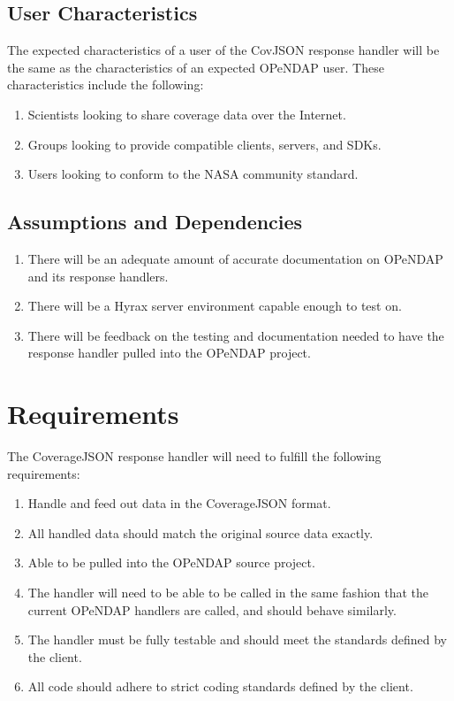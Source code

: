 \documentclass[onecolumn, draftclsnofoot,10pt, compsoc]{IEEEtran}
\begin{document}
\subsection{User Characteristics}
The expected characteristics of a user of the CovJSON response handler will be the same as the characteristics of an expected OPeNDAP user. These characteristics include the following:
\begin{enumerate}
\item Scientists looking to share coverage data over the Internet.
\item Groups looking to provide compatible clients, servers, and SDKs.
\item Users looking to conform to the NASA community standard.

\end{enumerate}

\subsection{Assumptions and Dependencies}
\begin{enumerate}
\item There will be an adequate amount of accurate documentation on OPeNDAP and its response handlers.
\item There will be a Hyrax server environment capable enough to test on.
\item There will be feedback on the testing and documentation needed to have the response handler pulled into the OPeNDAP project.
\end{enumerate}

\section{Requirements}
The CoverageJSON response handler will need to fulfill the following requirements:
\begin{enumerate}
\item Handle and feed out data in the CoverageJSON format.
\item All handled data should match the original source data exactly.
\item Able to be pulled into the OPeNDAP source project.
\item The handler will need to be able to be called in the same fashion that the current OPeNDAP handlers are called, and should behave similarly.
\item The handler must be fully testable and should meet the standards defined by the client.
\item All code should adhere to strict coding standards defined by the client.
\end{enumerate}
\end{document}
